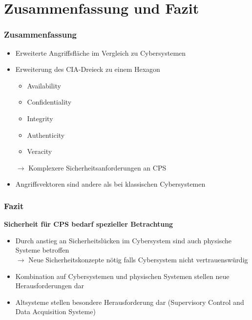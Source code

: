 \documentclass{sikslides}
\begin{document}
    \section{Zusammenfassung und Fazit}
    \begin{frame}[label=summary]
        \frametitle{Zusammenfassung}
        \begin{itemize}
            \item<1-> Erweiterte Angriffsfläche im Vergleich zu Cybersystemen
            \item<2-> Erweiterung des CIA-Dreieck zu einem Hexagon
            \begin{itemize}
                \item Availability
                \item Confidentiality
                \item Integrity
                \item Authenticity
                \item Veracity
            \end{itemize}
            $\rightarrow$ Komplexere Sicherheitsanforderungen an CPS
            \item<3-> Angriffsvektoren sind andere als bei klassischen Cybersystemen
        \end{itemize}
    \end{frame}

    \begin{frame}
        \frametitle{Fazit}

        \begin{center}
            \bf Sicherheit für CPS bedarf spezieller Betrachtung
        \end{center}

        \begin{itemize}[<+->]
            \item Durch anstieg an Sicherheitslücken im Cybersystem sind auch physische Systeme betroffen\\$\rightarrow$ Neue Sicherheitskonzepte nötig falls Cybersystem nicht vertrauenswürdig
            \item Kombination auf Cybersystemen und physischen Systemen stellen neue Herausforderungen dar
            \item Altsysteme stellen besondere Herausforderung dar (Supervisory Control and Data Acquisition Systeme)
        \end{itemize}
    \end{frame}

\end{document}
